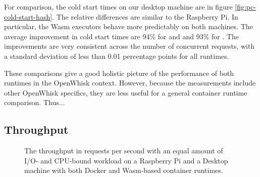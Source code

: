For comparison, the cold start times on our  desktop machine are in figure \ref{fig:pc-cold-start-hash}. The relative differences are similar to the Raspberry Pi. In particular, the Wasm executors behave more predictably on both machines. The average improvement in cold start times are 94\% for  and  and 93\% for . The improvements are very consistent across the number of concurrent requests, with a standard deviation of less than 0.01 percentage points for all runtimes.

These comparisons give a good holistic picture of the performance of both runtimes in the OpenWhisk context. However, because the measurements include other OpenWhisk specifics, they are less useful for a general container runtime comparison. Thus...


\subsection{Throughput}

\begin{figure}
    \begin{center}
        
    \end{center}
    \caption{The throughput in requests per second with an equal amount of I/O- and CPU-bound workload on a Raspberry Pi and a Desktop machine with both Docker and Wasm-based container runtimes.}
    \label{fig:pi-pc-load-mixed}
\end{figure}

